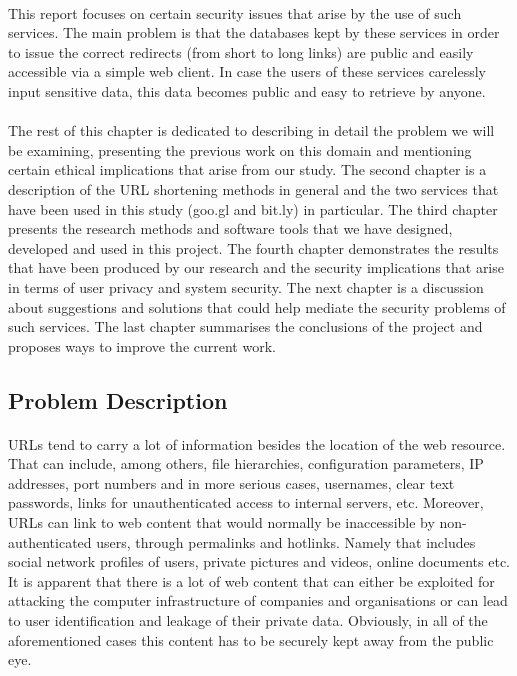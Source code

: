 \documentclass[12pt]{article}
\begin{document}
\paragraph{}
This report focuses on certain security issues that arise by the use of such services. The main problem is that the databases kept by these services in order to issue the correct redirects (from short to long links) are public and easily accessible via a simple web client. In case the users of these services carelessly input sensitive data, this data becomes public and easy to retrieve by anyone.
\paragraph{} 
The rest of this chapter is dedicated to describing in detail the problem we will be examining, presenting the previous work on this domain and mentioning certain ethical implications that arise from our study. The second chapter is a description of the URL shortening methods in general and the two services that have been used in this study (goo.gl and bit.ly) in particular. The third chapter presents the research methods and software tools that we have designed, developed and used in this project. The fourth chapter demonstrates the results that have been produced by our research and the security implications that arise in terms of user privacy and system security. The next chapter is a discussion about suggestions and solutions that could help mediate the security problems of such services. The last chapter summarises the conclusions of the project and proposes ways to improve the current work. 
\subsection{Problem Description}

\paragraph{}
URLs tend to carry a lot of information besides the location of the web resource. That can include, among others, file hierarchies, configuration parameters, IP addresses, port numbers and in more serious cases, usernames, clear text passwords, links for unauthenticated access to internal servers, etc. Moreover, URLs can link to web content that would normally be inaccessible by non-authenticated users, through permalinks and hotlinks. Namely that includes social network profiles of users, private pictures and videos, online documents etc. It is apparent that there is a lot of web content that can either be exploited for attacking the computer infrastructure of companies and organisations or can lead to user identification and leakage of their private data. Obviously, in all of the aforementioned cases this content has to be securely kept away from the public eye.
\end{document}
